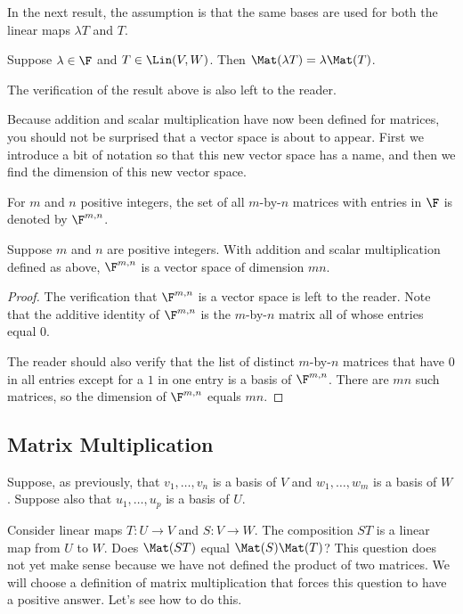 In the next result, the assumption is that the same bases are used for both the
linear maps $\lambda T$ and $T$.

\begin{result}\label{ax:3.38}
Suppose $\lambda\in\F$ and $T\in\Lin(V,W)$. Then
$\Mat(\lambda T)=\lambda\Mat(T)$.
\end{result}

The verification of the result above is also left to the reader.

Because addition and scalar multiplication have now been defined for matrices,
you should not be surprised that a vector space is about to appear. First we
introduce a bit of notation so that this new vector space has a name, and then
we find the dimension of this new vector space.

\begin{notation}[$\F^{m,n}$]\label{ax:3.39}
For $m$ and $n$ positive integers, the set of all $m$-by-$n$ matrices with
entries in $\F$ is denoted by $\F^{m,n}$.
\end{notation}

\begin{result}[$\dim\F^{m,n}=mn$]\label{ax:3.40}
Suppose $m$ and $n$ are positive integers. With addition and scalar
multiplication defined as above, $\F^{m,n}$ is a vector space of dimension
$mn$.
\end{result}

\begin{proof}
The verification that $\F^{m,n}$ is a vector space is left to the reader. Note
that the additive identity of $\F^{m,n}$ is the $m$-by-$n$ matrix all of whose
entries equal $0$.

The reader should also verify that the list of distinct $m$-by-$n$ matrices
that have $0$ in all entries except for a $1$ in one entry is a basis of
$\F^{m,n}$. There are $mn$ such matrices, so the dimension of $\F^{m,n}$ equals
$mn$.
\end{proof}

\subsection{Matrix Multiplication}

Suppose, as previously, that $v_1,\dots,v_n$ is a basis of $V$ and
$w_1,\dots,w_m$ is a basis of $W$. Suppose also that $u_1,\dots,u_p$ is a basis
of $U$.

Consider linear maps $T\colon U\to V$ and $S\colon V\to W$. The composition
$ST$ is a linear map from $U$ to $W$. Does $\Mat(ST)$ equal $\Mat(S)\Mat(T)$?
This question does not yet make sense because we have not defined the product
of two matrices. We will choose a definition of matrix multiplication that
forces this question to have a positive answer. Let's see how to do this.

